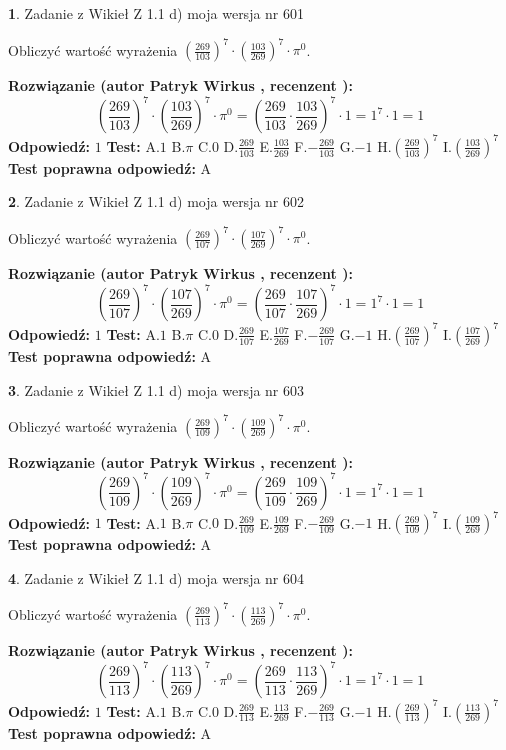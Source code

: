 \documentclass[12pt, a4paper]{article}
\theoremstyle{definition} %
\newtheorem{zad}{}
\newcommand{\zadStart}[1]{\begin{zad}#1\newline}
\newcommand{\zadStop}{\end{zad}}
\newcommand{\rozwStart}[2]{\noindent \textbf{Rozwiązanie (autor #1 , recenzent #2): }\newline}
\newcommand{\rozwStop}{\newline}
\newcommand{\odpStart}{\noindent \textbf{Odpowiedź:}\newline}
\newcommand{\odpStop}{\newline}
\newcommand{\testStart}{\noindent \textbf{Test:}\newline}
\newcommand{\testStop}{\newline}
\newcommand{\kluczStart}{\noindent \textbf{Test poprawna odpowiedź:}\newline}
\newcommand{\kluczStop}{\newline}
\begin{document}
\zadStart{Zadanie z Wikieł Z 1.1 d) moja wersja nr 601}

Obliczyć wartość wyrażenia $(\frac{269}{103})^{7} \cdot (\frac{103}{269})^{7} \cdot \pi^{0}$.
\zadStop
\rozwStart{Patryk Wirkus}{}
$$(\frac{269}{103})^{7} \cdot (\frac{103}{269})^{7} \cdot \pi^{0} = (\frac{269}{103} \cdot \frac{103}{269})^{7} \cdot 1 = 1^{7} \cdot 1 = 1$$
\rozwStop
\odpStart
$1$
\odpStop
\testStart
A.$1$ B.$\pi$ C.$0$ D.$\frac{269}{103}$ E.$\frac{103}{269}$
F.$-\frac{269}{103}$ G.$-1$
H.$(\frac{269}{103})^{7}$
I.$(\frac{103}{269})^{7}$
\testStop
\kluczStart
A
\kluczStop



\zadStart{Zadanie z Wikieł Z 1.1 d) moja wersja nr 602}

Obliczyć wartość wyrażenia $(\frac{269}{107})^{7} \cdot (\frac{107}{269})^{7} \cdot \pi^{0}$.
\zadStop
\rozwStart{Patryk Wirkus}{}
$$(\frac{269}{107})^{7} \cdot (\frac{107}{269})^{7} \cdot \pi^{0} = (\frac{269}{107} \cdot \frac{107}{269})^{7} \cdot 1 = 1^{7} \cdot 1 = 1$$
\rozwStop
\odpStart
$1$
\odpStop
\testStart
A.$1$ B.$\pi$ C.$0$ D.$\frac{269}{107}$ E.$\frac{107}{269}$
F.$-\frac{269}{107}$ G.$-1$
H.$(\frac{269}{107})^{7}$
I.$(\frac{107}{269})^{7}$
\testStop
\kluczStart
A
\kluczStop



\zadStart{Zadanie z Wikieł Z 1.1 d) moja wersja nr 603}

Obliczyć wartość wyrażenia $(\frac{269}{109})^{7} \cdot (\frac{109}{269})^{7} \cdot \pi^{0}$.
\zadStop
\rozwStart{Patryk Wirkus}{}
$$(\frac{269}{109})^{7} \cdot (\frac{109}{269})^{7} \cdot \pi^{0} = (\frac{269}{109} \cdot \frac{109}{269})^{7} \cdot 1 = 1^{7} \cdot 1 = 1$$
\rozwStop
\odpStart
$1$
\odpStop
\testStart
A.$1$ B.$\pi$ C.$0$ D.$\frac{269}{109}$ E.$\frac{109}{269}$
F.$-\frac{269}{109}$ G.$-1$
H.$(\frac{269}{109})^{7}$
I.$(\frac{109}{269})^{7}$
\testStop
\kluczStart
A
\kluczStop



\zadStart{Zadanie z Wikieł Z 1.1 d) moja wersja nr 604}

Obliczyć wartość wyrażenia $(\frac{269}{113})^{7} \cdot (\frac{113}{269})^{7} \cdot \pi^{0}$.
\zadStop
\rozwStart{Patryk Wirkus}{}
$$(\frac{269}{113})^{7} \cdot (\frac{113}{269})^{7} \cdot \pi^{0} = (\frac{269}{113} \cdot \frac{113}{269})^{7} \cdot 1 = 1^{7} \cdot 1 = 1$$
\rozwStop
\odpStart
$1$
\odpStop
\testStart
A.$1$ B.$\pi$ C.$0$ D.$\frac{269}{113}$ E.$\frac{113}{269}$
F.$-\frac{269}{113}$ G.$-1$
H.$(\frac{269}{113})^{7}$
I.$(\frac{113}{269})^{7}$
\testStop
\kluczStart
A
\kluczStop
\end{document}
